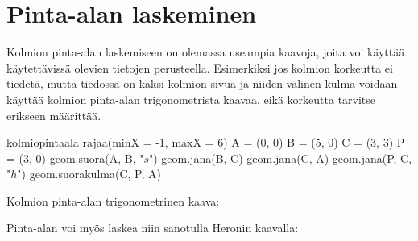 \section*{Pinta-alan laskeminen}

Kolmion pinta-alan laskemiseen on olemassa useampia kaavoja, joita voi käyttää käytettävissä olevien tietojen perusteella. Esimerkiksi jos kolmion korkeutta ei tiedetä, mutta tiedossa on kaksi kolmion sivua ja niiden välinen kulma voidaan käyttää  kolmion pinta-alan trigonometrista kaavaa, eikä korkeutta tarvitse erikseen määrittää.

\begin{luoKuva}{kolmiopintaala}
	rajaa(minX = -1, maxX = 6)
	A = (0, 0)
	B = (5, 0)
	C = (3, 3)
	P = (3, 0)
	geom.suora(A, B, "$s$")
	geom.jana(B, C)
	geom.jana(C, A)
	geom.jana(P, C, "$h$")
	geom.suorakulma(C, P, A)
\end{luoKuva}

Kolmion pinta-alan trigonometrinen kaava:


Pinta-alan voi myös laskea niin sanotulla Heronin kaavalla: 


